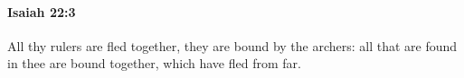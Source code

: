 
		\paragraph{Isaiah 22:3} %
			\label{ISAIAH-22-3}

			All thy rulers are fled together, they are bound by the archers: all that are found in thee are bound together, which have fled from far.


